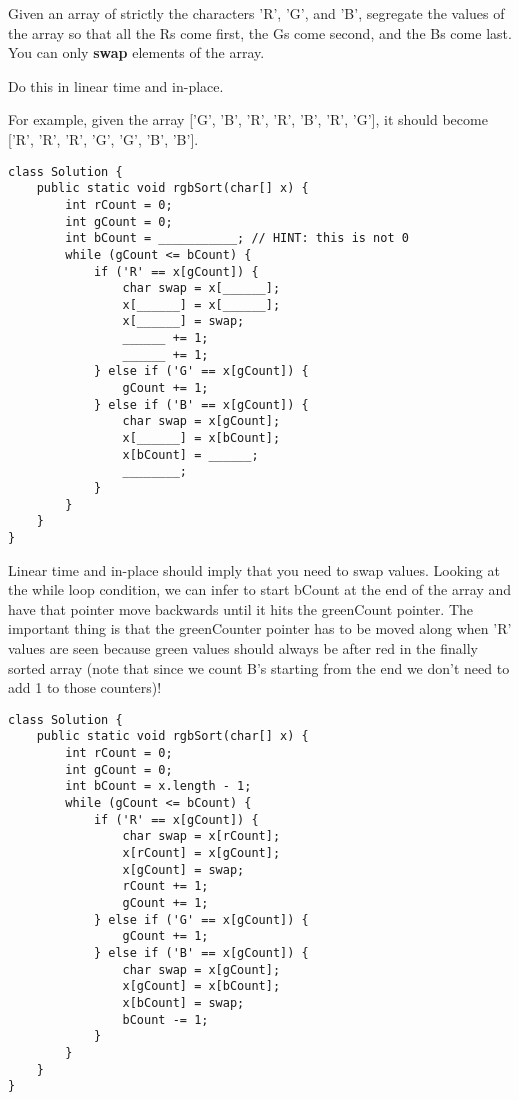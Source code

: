 \begin{blocksection}
\question Given an array of strictly the characters 'R', 'G', and 'B', segregate the values of the array so that all the Rs come first, the Gs come second, and the Bs come last. You can only \textbf{swap} elements of the array.

Do this in linear time and in-place.

For example, given the array ['G', 'B', 'R', 'R', 'B', 'R', 'G'], it should become ['R', 'R', 'R', 'G', 'G', 'B', 'B'].

\begin{lstlisting}
class Solution {
    public static void rgbSort(char[] x) {
        int rCount = 0;
        int gCount = 0;
        int bCount = ___________; // HINT: this is not 0
        while (gCount <= bCount) {
            if ('R' == x[gCount]) {
                char swap = x[______];
                x[______] = x[______];
                x[______] = swap;
                ______ += 1;
                ______ += 1;
            } else if ('G' == x[gCount]) {
                gCount += 1;
            } else if ('B' == x[gCount]) {
                char swap = x[gCount];
                x[______] = x[bCount];
                x[bCount] = ______;
                ________;
            }
        }
    }
}
\end{lstlisting}

\begin{solution}[1in]

Linear time and in-place should imply that you need to swap values. Looking at the while loop condition, we can infer to start bCount at the end of the array and have that pointer move backwards until it hits the greenCount pointer. The important thing is that the greenCounter pointer has to be moved along when 'R' values are seen because green values should always be after red in the finally sorted array (note that since we count B's starting from the end we don't need to add 1 to those counters)!

\begin{lstlisting}
class Solution {
    public static void rgbSort(char[] x) {
        int rCount = 0;
        int gCount = 0;
        int bCount = x.length - 1;
        while (gCount <= bCount) {
            if ('R' == x[gCount]) {
                char swap = x[rCount];
                x[rCount] = x[gCount];
                x[gCount] = swap;
                rCount += 1;
                gCount += 1;
            } else if ('G' == x[gCount]) {
                gCount += 1;
            } else if ('B' == x[gCount]) {
                char swap = x[gCount];
                x[gCount] = x[bCount];
                x[bCount] = swap;
                bCount -= 1;
            }
        }
    }
}
\end{lstlisting}
\end{solution}
\end{blocksection}

